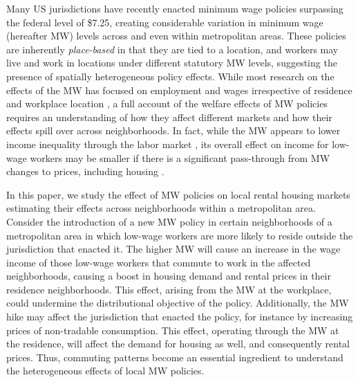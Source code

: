 

Many US jurisdictions have recently enacted minimum wage policies surpassing the 
federal level of \$7.25, creating considerable variation in minimum wage 
(hereafter MW) levels across and even within metropolitan areas.
These policies are inherently \textit{place-based} in that they are tied to 
a location, and workers may live and work in locations under different 
statutory MW levels, suggesting the presence of spatially heterogeneous policy 
effects.
While most research on the effects of the MW has focused on employment and 
wages irrespective of residence and workplace location
\parencite[e.g.,][]{CardKrueger1994, CegnizEtAl2019},
a full account of the welfare effects of MW policies requires an understanding 
of how they affect different markets and how their effects spill over across 
neighborhoods.
In fact, while the MW appears to lower income inequality through the labor 
market \parencite{Lee1999, AutorEtAl2016},
its overall effect on income for low-wage workers may be smaller if there is 
a significant pass-through from MW changes to prices, including housing
\parencite{Macurdy2015}.

In this paper, we study the effect of MW policies on local rental housing 
markets estimating their effects across neighborhoods within a metropolitan
area.
Consider the introduction of a new MW policy in certain neighborhoods of a
metropolitan area in which low-wage workers are more likely to reside outside 
the jurisdiction that enacted it.
The higher MW will cause an increase in the wage income of those low-wage 
workers that commute to work in the affected neighborhoods, causing a boost in 
housing demand and rental prices in their residence neighborhoods.
This effect, arising from the MW at the workplace, could undermine the 
distributional objective of the policy.
Additionally, the MW hike may affect the jurisdiction that enacted the policy, 
for instance by increasing prices of non-tradable consumption.
This effect, operating through the MW at the residence, will affect the 
demand for housing as well, and consequently rental prices.
Thus, commuting patterns become an essential ingredient to understand the 
heterogeneous effects of local MW policies.

